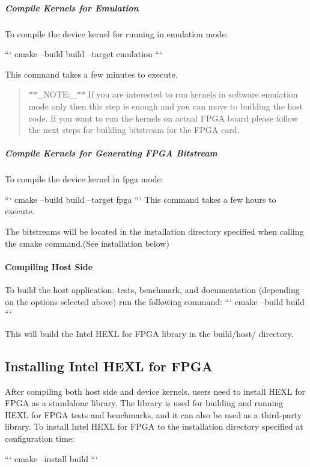 \subparagraph*{Compile Kernels for Emulation}

To compile the device kernel for running in emulation mode\-: \par
 ``` cmake --build build --target emulation ```

This command takes a few minutes to execute.

\begin{quotation}
$\ast$$\ast$\-\_\-\-N\-O\-T\-E\-:\-\_\-$\ast$$\ast$ If you are interested to run kernels in software emulation mode only then this step is enough and you can move to building the host code. If you want to run the kernels on actual F\-P\-G\-A board please follow the next steps for building bitstream for the F\-P\-G\-A card.

\end{quotation}


\subparagraph*{Compile Kernels for Generating F\-P\-G\-A Bitstream}

To compile the device kernel in fpga mode\-: \par
 ``` cmake --build build --target fpga ``` This command takes a few hours to execute.

The bitstreams will be located in the installation directory specified when calling the cmake command.(See installation below) \par


\paragraph*{Compiling Host Side}

To build the host application, tests, benchmark, and documentation (depending on the options selected above) run the following command\-: ``` cmake --build build ```

This will build the Intel H\-E\-X\-L for F\-P\-G\-A library in the {\ttfamily build/host/} directory. \par


\subsection*{Installing Intel H\-E\-X\-L for F\-P\-G\-A}

After compiling both host side and device kernels, users need to install H\-E\-X\-L for F\-P\-G\-A as a standalone library. The library is used for building and running H\-E\-X\-L for F\-P\-G\-A tests and benchmarks, and it can also be used as a third-\/party library. To install Intel H\-E\-X\-L for F\-P\-G\-A to the installation directory specified at configuration time\-: \par
 ``` cmake --install build ```

